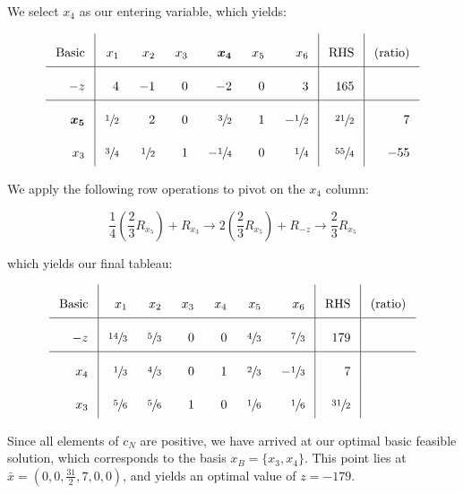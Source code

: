 \begin{solution}
  We select $x_4$ as our entering variable, which yields:

  \[\arraycolsep=8pt\def\arraystretch{2.2}
  \begin{array}{r|rrrrrr|r|r}
    \text{Basic} &  x_1            &  x_2            &  x_3  &  \bm{x_4}       &  x_5  &  x_6            & \text{RHS}     & \text{(ratio)}  \\ \hline
    -z           &   4             &  -1             &  0    &  -2             &   0   &   3             &  165           &                 \\ \hline
    \bm{x_5}     &   \sfrac{1}{2}  &   2             &  0    &   \sfrac{3}{2}  &   1   &  -\sfrac{1}{2}  &  \sfrac{21}{2} & 7               \\
    x_3          &   \sfrac{3}{4}  &   \sfrac{1}{2}  &  1    &  -\sfrac{1}{4}  &   0   &   \sfrac{1}{4}  &  \sfrac{55}{4} & -55                           
  \end{array}
  \]

  We apply the following row operations to pivot on the $x_4$ column:

  $$
  \frac{1}{4}\left(\frac{2}{3} R_{x_5} \right) + R_{x_3} \longrightarrow 
  2 \left(\frac{2}{3} R_{x_5} \right) + R_{-z} \longrightarrow
  \frac{2}{3} R_{x_5}
  $$

  \pagebreak

  which yields our final tableau:

  \[\arraycolsep=8pt\def\arraystretch{2.2}
  \begin{array}{r|rrrrrr|r|r}
    \text{Basic} &  x_1           &  x_2           &  x_3  &  x_4  &  x_5           &   x_6           & \text{RHS}     & \text{(ratio)}  \\ \hline
    -z           &  \sfrac{14}{3} &  \sfrac{5}{3}  &   0   &  0    &  \sfrac{4}{3}  &   \sfrac{7}{3}  &  179           &                 \\ \hline
    x_4          &  \sfrac{1}{3}  &  \sfrac{4}{3}  &   0   &  1    &  \sfrac{2}{3}  &  -\sfrac{1}{3}  &  7             &                 \\
    x_3          &  \sfrac{5}{6}  &  \sfrac{5}{6}  &   1   &  0    &  \sfrac{1}{6}  &   \sfrac{1}{6}  &  \sfrac{31}{2} &                            
  \end{array}
  \]

  Since all elements of $c_N$ are positive, we have arrived at our optimal basic feasible solution, which corresponds to
  the basis $x_B = \{x_3, x_4\}$. This point lies at \linebreak
  $\bar{x} = \left(0, 0, \frac{31}{2}, 7, 0, 0\right)$, and yields an optimal value of $z = -179$.
  \ \\
\end{solution}